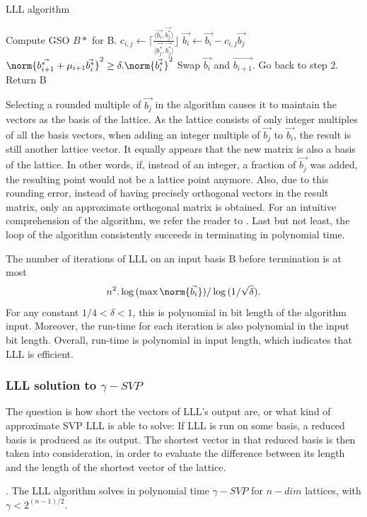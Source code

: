 \begin{algorithm}
  \caption{LLL algorithm}
  \label{alg:LLL}
  \begin{algorithmic}[1]
     \State Compute GSO $B*$ for B.  
     \State
    $c_{i,j} \gets \lceil{\frac{\langle \vec{b_i}, \vec{b_j^*} \rangle}{\langle
        \vec{b_j^*},\vec{b_j^*}\rangle}}\rfloor$ \State
    $\vec{b_i} \gets \vec{b_i} - c_{i,j}\vec{b_j}$ \EndFor \EndFor \If
    {$\norm{\vec{b_{i+1}^*}+\mu_{i+1}\vec{b_i^*}}^2 \geq \delta
      . \norm{\vec{b_i^*}}^2$} \State Swap $\vec{b_i}$ and $\vec{b_{i+1}}$.
    \State Go back to step 2.  \Else \State Return B \EndIf \EndProcedure
  \end{algorithmic}
\end{algorithm}
Selecting a rounded multiple of $\vec{b_j}$ in the algorithm causes it to maintain the vectors as the basis of the lattice. As the lattice consists of only integer multiples of all the basis
vectors, when adding an integer multiple of $\vec{b_j}$ to $\vec{b_i}$, the result is still another lattice vector. It equally appears that the new matrix is also
a basis of the lattice. In other words, if, instead of an integer, a fraction of $\vec{b_j}$ was added, the resulting point would not be a lattice point anymore. Also, due to this rounding error, instead of having precisely orthogonal vectors in the result matrix, only an approximate
orthogonal matrix is obtained. For an intuitive comprehension of the algorithm, we refer the reader to
\cite{lenstra1982factoring}. Last but not least, the loop of the algorithm consistently succeeds in terminating in polynomial time.
\begin{theorem}
   The number of iterations of LLL on an input basis B before
  termination is at most
  \[
    n^2.\log{(\max{\norm{\vec{b_i}}})} / \log{(1/\sqrt{\delta})}.
  \]
  For any constant $1/4 < \delta < 1$, this is polynomial in bit length of the
  algorithm input. Moreover, the run-time for each iteration is also polynomial
  in the input bit length. Overall, run-time is polynomial in input length, which indicates that
  LLL is efficient.
  \label{theo:LLLRunTime}
\end{theorem}

\subsubsection{LLL solution to $\gamma-SVP$}
\label{sec:LLLsolution}
The question is how short the vectors of LLL's output are, or what kind of
approximate SVP LLL is able to solve: If LLL is run on some basis, a
reduced basis is produced as its output. The shortest vector in that reduced basis is then taken into consideration, in order to evaluate the difference between its length and the length of the shortest vector of the lattice.
\begin{theorem}
  . The LLL algorithm solves in polynomial time
  $\gamma-SVP$ for $n-dim$ lattices, with $\gamma < 2^{(n-1)/2}$.
  \label{theo:LLLShortVector}
\end{theorem}

